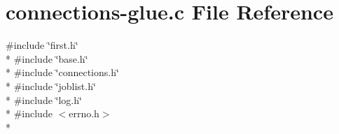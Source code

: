 \hypertarget{connections-glue_8c}{\section{connections-\/glue.c File Reference}
\label{connections-glue_8c}
}
{\ttfamily \#include \char`\"{}first.\-h\char`\"{}}\\*
{\ttfamily \#include \char`\"{}base.\-h\char`\"{}}\\*
{\ttfamily \#include \char`\"{}connections.\-h\char`\"{}}\\*
{\ttfamily \#include \char`\"{}joblist.\-h\char`\"{}}\\*
{\ttfamily \#include \char`\"{}log.\-h\char`\"{}}\\*
{\ttfamily \#include $<$errno.\-h$>$}\\*
